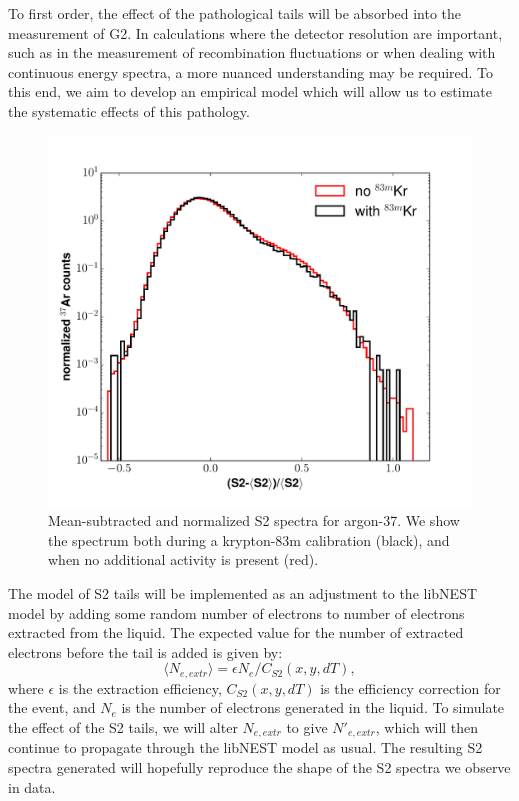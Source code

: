 To first order, the effect of the pathological tails will be absorbed into the measurement of G2. In calculations where the detector resolution are important, such as in the measurement of recombination fluctuations or when dealing with continuous energy spectra, a more nuanced understanding may be required. To this end, we aim to develop an empirical model which will allow us to estimate the systematic effects of this pathology.
\begin{figure}[h!]
  \centering
  \includegraphics[width=\textwidth]{Figures/S2_tail_spec_Ar_rate.pdf}
  \caption{Mean-subtracted and normalized S2 spectra for argon-37. We show the spectrum both during a krypton-83m calibration (black), and when no additional activity is present (red).}
\label{fig:E_spec_tails_ar} 
\end{figure}

The model of S2 tails will be implemented as an adjustment to the libNEST model by adding some random number of electrons to number of electrons extracted from the liquid. The expected value for the number of extracted electrons before the tail is added is given by:
\begin{equation}
\langle N_{e,extr} \rangle = \epsilon N_{e} /C_{S2}(x,y,dT),
\end{equation}
where $\epsilon$ is the extraction efficiency, $C_{S2}(x,y,dT)$ is the efficiency correction for the event, and $N_e$ is the number of electrons generated in the liquid. To simulate the effect of the S2 tails, we will alter $N_{e,extr}$ to give $N'_{e,extr}$, which will then continue to propagate through the libNEST model as usual. The resulting S2 spectra generated will hopefully reproduce the shape of the S2 spectra we observe in data.


